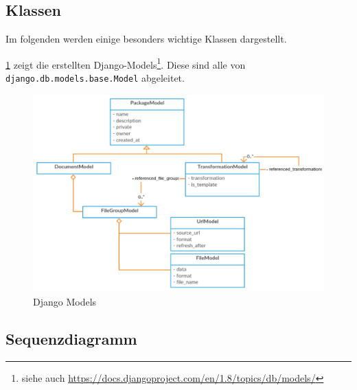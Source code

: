 \subsection{Klassen}
Im folgenden werden einige besonders wichtige Klassen dargestellt.

\cref{fig:pd:modelclasses} zeigt die erstellten Django-Models\footnote{siehe auch \url{https://docs.djangoproject.com/en/1.8/topics/db/models/}}. Diese sind alle von \texttt{django.db.models.base.Model} abgeleitet.
\begin{figure}[H]
    \centering
    \includegraphics[width=\linewidth]{fig/model-classes}
    \caption{Django Models}
    \label{fig:pd:modelclasses}
\end{figure}


\subsection{Sequenzdiagramm}
